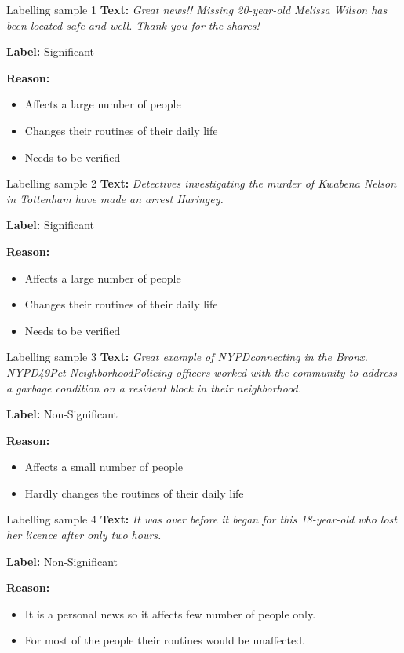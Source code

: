 \documentclass[12pt]{beamer}
\begin{document}
\begin{frame}{Labelling sample 1}
\textbf{Text:}
\textit{Great news!! Missing 20-year-old Melissa Wilson has been located safe and well. Thank you for the shares!}\par
\textbf{Label:} Significant\par
\textbf{Reason:}
\begin{itemize}
    \item Affects a large number of people
    \item Changes their routines of their daily life
    \item Needs to be verified
\end{itemize}
\end{frame}

\begin{frame}{Labelling sample 2}
\textbf{Text:}
\textit{Detectives investigating the murder of Kwabena Nelson in Tottenham have made an arrest Haringey.}\par
\textbf{Label:} Significant\par
\textbf{Reason:}
\begin{itemize}
    \item Affects a large number of people
    \item Changes their routines of their daily life
    \item Needs to be verified
\end{itemize}
\end{frame}

\begin{frame}{Labelling sample 3}
\textbf{Text:}
\textit{Great example of NYPDconnecting in the Bronx. NYPD49Pct NeighborhoodPolicing officers worked with the community to address a garbage condition on a resident block in their neighborhood.}\par
\textbf{Label:} Non-Significant\par
\textbf{Reason:}
\begin{itemize}
    \item Affects a small number of people
    \item Hardly changes the routines of their daily life
\end{itemize}
\end{frame}

\begin{frame}{Labelling sample 4}
\textbf{Text:}
\textit{It was over before it began for this 18-year-old who lost her licence after only two hours.}\par
\textbf{Label:} Non-Significant\par
\textbf{Reason:}
\begin{itemize}
    \item It is a personal news so it affects few number of people only.
    \item For most of the people their routines would be unaffected.
\end{itemize}
\end{frame}
\end{document}
